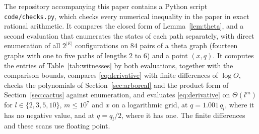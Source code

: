 \documentclass[11pt]{amsart}
\theoremstyle{remark}
\numberwithin{equation}{section}
\begin{document}
The repository accompanying this paper contains a Python script \texttt{code/checks.py}, which checks every numerical inequality in the paper in exact rational arithmetic. It compares the closed form of Lemma~\ref{lem:theta}, and a second evaluation that enumerates the states of each path separately, with direct enumeration of all $2^{|E|}$ configurations on $84$ pairs of a theta graph (fourteen graphs with one to five paths of lengths $2$ to $6$) and a point $(x,q)$. It computes the entries of Table~\ref{tab:witnesses} by both evaluations, together with the comparison bounds, compares \eqref{eq:derivative} with finite differences of $\log O$, checks the polynomials of Section~\ref{sec:arboreal} and the product form of Section~\ref{sec:cactus} against enumeration, and evaluates \eqref{eq:derivative} on $\Theta(l^m)$ for $l\in\{2,3,5,10\}$, $m\le10^7$ and $x$ on a logarithmic grid, at $q=1.001\,q_l$, where it has no negative value, and at $q=q_l/2$, where it has one. The finite differences and these scans use floating point.
\end{document}
